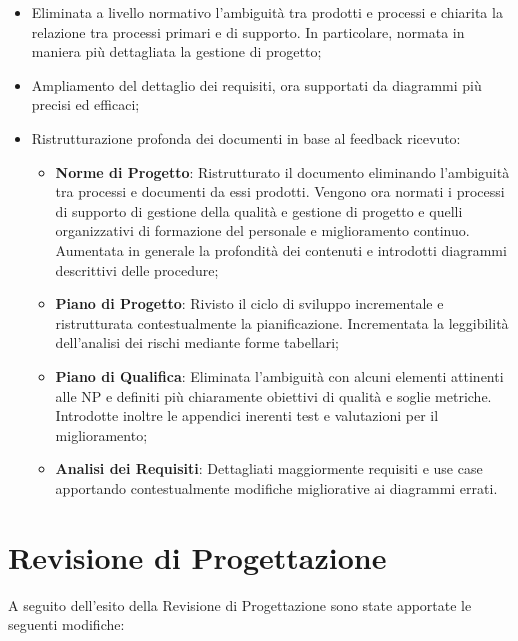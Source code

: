 \documentclass[openany,12pt,a4paper]{report}
\begin{document}
\begin{itemize}
	\item Eliminata a livello normativo l’ambiguità tra prodotti e processi e chiarita la relazione tra processi primari e di supporto. In particolare, normata in maniera più dettagliata la gestione di progetto;
	\item Ampliamento del dettaglio dei requisiti, ora supportati da diagrammi più precisi ed efficaci;
	\item Ristrutturazione profonda dei documenti in base al feedback ricevuto:
	\begin{itemize}
		\item \textbf{Norme di Progetto}: Ristrutturato il documento eliminando l'ambiguità tra processi e documenti da essi prodotti. Vengono ora normati i processi di supporto di gestione della qualità e gestione di progetto e quelli organizzativi di formazione del personale e miglioramento continuo. Aumentata in generale la profondità dei contenuti e introdotti diagrammi descrittivi delle procedure;
		\item \textbf{Piano di Progetto}: Rivisto il ciclo di sviluppo incrementale e ristrutturata contestualmente la pianificazione. Incrementata la leggibilità dell'analisi dei rischi mediante forme tabellari;
		\item \textbf{Piano di Qualifica}: Eliminata l'ambiguità con alcuni elementi attinenti alle NP e definiti più chiaramente obiettivi di qualità e soglie metriche. Introdotte inoltre le appendici inerenti test e valutazioni per il miglioramento;
		\item \textbf{Analisi dei Requisiti}: Dettagliati maggiormente requisiti e use case apportando contestualmente modifiche migliorative ai diagrammi errati.
	\end{itemize}
\end{itemize}

\section{Revisione di Progettazione}

A seguito dell'esito della Revisione di Progettazione sono state apportate le seguenti modifiche:
\end{document}
